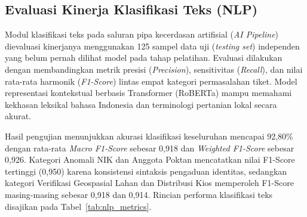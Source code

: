 \documentclass[conference]{IEEEtran}
\begin{document}
\subsection{Evaluasi Kinerja Klasifikasi Teks (NLP)}
Modul klasifikasi teks pada saluran pipa kecerdasan artifisial (\textit{AI Pipeline}) dievaluasi kinerjanya menggunakan 125 sampel data uji (\textit{testing set}) independen yang belum pernah dilihat model pada tahap pelatihan. Evaluasi dilakukan dengan membandingkan metrik presisi (\textit{Precision}), sensitivitas (\textit{Recall}), dan nilai rata-rata harmonik (\textit{F1-Score}) lintas empat kategori permasalahan tiket. Model representasi kontekstual berbasis Transformer (RoBERTa) mampu memahami kekhasan leksikal bahasa Indonesia dan terminologi pertanian lokal secara akurat.

Hasil pengujian menunjukkan akurasi klasifikasi keseluruhan mencapai 92,80\% dengan rata-rata \textit{Macro F1-Score} sebesar 0,918 dan \textit{Weighted F1-Score} sebesar 0,926. Kategori Anomali NIK dan Anggota Poktan mencatatkan nilai F1-Score tertinggi (0,950) karena konsistensi sintaksis pengaduan identitas, sedangkan kategori Verifikasi Geospasial Lahan dan Distribusi Kios memperoleh F1-Score masing-masing sebesar 0,918 dan 0,914. Rincian performa klasifikasi teks disajikan pada Tabel~\ref{tab:nlp_metrics}.

\begin{table}[htbp]
\caption{Metrik Kinerja Evaluasi Klasifikasi Teks (NLP)}
\begin{center}
\label{tab:nlp_metrics}
\end{center}
\end{table}
\end{document}
